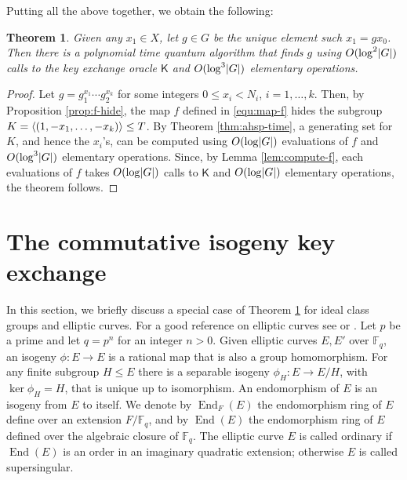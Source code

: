 \documentclass[11pt]{article}
\theoremstyle{plain}
\newtheorem{theorem}{Theorem}[section]
\theoremstyle{definition}
\DeclareMathOperator{\groupofend}{End} %
\DeclarePairedDelimiter{\abs}{\lvert}{\rvert}
\DeclarePairedDelimiter{\lrang}{\langle}{\rangle}
\def\F{\mathbb{F}}
\newcommand{\kex}{\mathsf{K}}
\begin{document}
Putting all the above together, we obtain the following:
\begin{theorem}
\label{thm:reduc}
	Given any $x_1 \in X$, let $g \in G$ be the unique element such $x_1 = gx_0$. Then there is a 
	polynomial time quantum algorithm that finds $g$ using $O(\log^2 \abs{G})$ calls to the key 
	exchange oracle $\kex$ and $O(\log^3 \abs{G})$ elementary operations.
\end{theorem}
\begin{proof}
	Let $g = g_1^{x_1} \cdots g_2^{x_k}$ for some integers $0 \le x_i < N_i$, $i = 1, \dots, k$. 
	Then, by Proposition \ref{prop:f-hide}, the map $f$ defined in \eqref{equ:map-f} hides the 
	subgroup $K = \lrang{(1, -x_1, \dots, -x_k)} \le T$. By Theorem \ref{thm:ahsp-time}, a 
	generating set for $K$, and hence the $x_i$'s, can be computed using $O(\log \abs{G})$ 
	evaluations of $f$ and $O(\log^3 \abs{G})$ elementary operations. Since, by Lemma 
	\ref{lem:compute-f}, each evaluations of $f$ takes $O(\log \abs{G})$ calls to $\kex$ and $O(\log 
	\abs{G})$ elementary operations, the theorem follows.
\end{proof}









\section{The commutative isogeny key exchange}
\label{sec:csidh}

In this section, we briefly discuss a special case of Theorem \ref{thm:reduc} for ideal class groups 
and elliptic curves. For a good reference on elliptic curves see \cite{silverman2009arithmetic} or 
\cite{washington2003elliptic}. Let $p$ be a prime and let $q = p^n$ for an integer $n > 0$. Given 
elliptic curves $E, E'$ over $\F_q$, an isogeny $\phi: E \rightarrow E$ is a rational map that is 
also a group homomorphism. For any finite subgroup $H \le E$ there is a separable isogeny $\phi_H: E 
\rightarrow E / H$, with $\ker \phi_H = H$, that is unique up to isomorphism. An endomorphism of $E$ 
is an isogeny from $E$ to itself. We denote by $\groupofend_F(E)$ the endomorphism ring of $E$ define 
over an extension $F / \F_q$, and by $\groupofend(E)$ the endomorphism ring of $E$ defined over the 
algebraic closure of $\F_q$. The elliptic curve $E$ is called ordinary if $\groupofend(E)$ is an 
order in an imaginary quadratic extension; otherwise $E$ is called supersingular.
\end{document}
